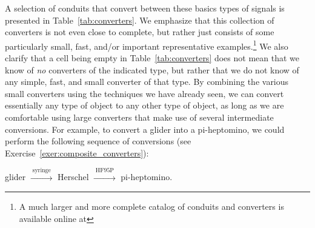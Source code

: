A selection of conduits that convert between these basics types of signals is presented in Table~\ref{tab:converters}. We emphasize that this collection of converters is not even close to complete, but rather just consists of some particularly small, fast, and/or important representative examples.\footnote{A much larger and more complete catalog of conduits and converters is available online at } We also clarify that a cell being empty in Table~\ref{tab:converters} does not mean that we know of \emph{no} converters of the indicated type, but rather that we do not know of any simple, fast, and small converter of that type. By combining the various small converters using the techniques we have already seen, we can convert essentially any type of object to any other type of object, as long as we are comfortable using large converters that make use of several intermediate conversions. For example, to convert a glider into a pi-heptomino, we could perform the following sequence of conversions (see Exercise~\ref{exer:composite_converters}):

\begin{center}
	glider $\xrightarrow{{}_{} \ \text{syringe} \ {}_{}}$ Herschel $\xrightarrow{{}_{} \ \text{HF95P} \ {}_{}}$ pi-heptomino.
\end{center}


